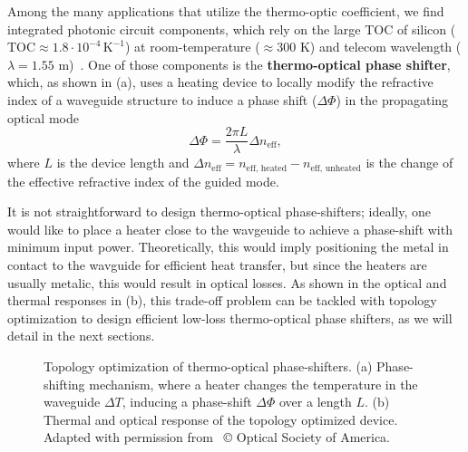 Among the many applications that utilize the thermo-optic coefficient, we find integrated photonic circuit components, which rely on the large 
TOC of silicon ($\text{TOC} \approx 1.8 \cdot 10^{-4}\, \text{K}^{-1}$) at room-temperature ($\approx300$ K) and telecom wavelength 
($\lambda=1.55$ \textmu m)~\cite{thermo-optic-coef}. One of those components is the \textbf{thermo-optical phase shifter}, which, as shown in  (a),
uses a heating device to locally modify the refractive index of a waveguide structure to induce a phase shift ($\Delta \Phi$) in the propagating optical mode
\begin{equation*}
\Delta \Phi = \frac{2\pi L}{\lambda} \Delta n_\text{eff},
\end{equation*}
where $L$ is the device length and $\Delta n_\text{eff} = n_\text{eff, heated} - n_\text{eff, unheated}$
 is the change of the effective refractive index of the guided mode. 
 
 It is not straightforward to design thermo-optical phase-shifters; ideally, one would like to place a heater close to the wavgeuide to achieve a phase-shift with minimum input power.
 Theoretically, this would imply positioning the metal in contact to the wavguide for efficient heat transfer, but since the heaters are usually metalic, this would result
 in optical losses. As shown in the optical and thermal responses in  (b), this trade-off problem can be tackled with topology optimization to design efficient low-loss thermo-optical phase shifters, 
 as we will detail in the next sections.

\begin{figure}[tb]
    \centering
    \caption{Topology optimization of thermo-optical phase-shifters. (a) Phase-shifting mechanism, where a heater changes the temperature in the waveguide $\Delta T$, inducing a phase-shift
    $\Delta \Phi$ over a length $L$. (b) Thermal and optical response of the topology optimized device. Adapted with permission from~\cite{ownpub0} © Optical Society of America.}
    \label{fig:thermo_res}
\end{figure}


